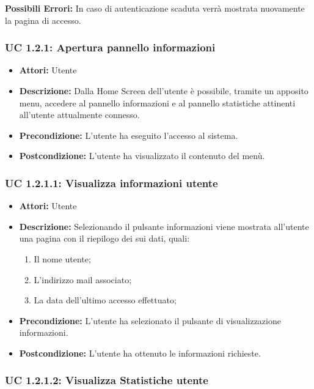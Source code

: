 \textbf{Possibili Errori:}
In caso di autenticazione scaduta verrà mostrata nuovamente la pagina di accesso.

\subsubsection{UC 1.2.1: Apertura pannello informazioni}

\begin{itemize}
    \item \textbf{Attori:} Utente
    \item \textbf{Descrizione:} Dalla Home Screen dell'utente è possibile, tramite un apposito menu, accedere al pannello informazioni e al pannello statistiche attinenti all'utente attualmente connesso.
    \item \textbf{Precondizione:} L'utente ha eseguito l'accesso al sistema.
    \item \textbf{Postcondizione:} L'utente ha visualizzato il contenuto del menù.
\end{itemize}

\subsubsection{UC 1.2.1.1: Visualizza informazioni utente}

\begin{itemize}
    \item \textbf{Attori:} Utente
    \item \textbf{Descrizione:} Selezionando il pulsante informazioni viene mostrata all'utente una pagina con il riepilogo dei sui dati, quali:
    \begin{enumerate}
        \item Il nome utente;
        \item L'indirizzo mail associato;
        \item La data dell'ultimo accesso effettuato;
    \end{enumerate}
    \item \textbf{Precondizione:} L'utente ha selezionato il pulsante di visualizzazione informazioni.
    \item \textbf{Postcondizione:} L'utente ha ottenuto le informazioni richieste.
\end{itemize}

\subsubsection{UC 1.2.1.2: Visualizza Statistiche utente}

